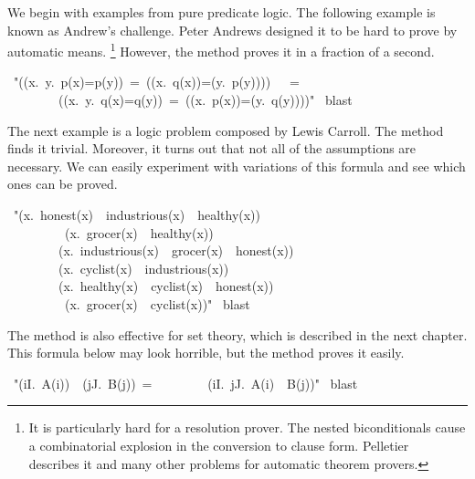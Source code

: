  We begin with examples from pure predicate logic. The following 
example is known as Andrew's challenge. Peter Andrews designed 
it to be hard to prove by automatic means.%
\footnote{It is particularly hard for a resolution prover.  The
nested biconditionals cause a combinatorial explosion in the conversion to
clause form.  Pelletier~\cite{pelletier86} describes it and many other
problems for automatic theorem provers.} 
However, the
 method proves it in a fraction  of a second. 
\begin{isabelle}
\
"(({\isasymexists}x.\
{\isasymforall}y.\
p(x){=}p(y))\
=\
(({\isasymexists}x.\
q(x))=({\isasymforall}y.\
p(y))))\
\ \ =\ \ \ \ \isanewline
\ \ \ \ \ \ \ \
(({\isasymexists}x.\
{\isasymforall}y.\
q(x){=}q(y))\ =\ (({\isasymexists}x.\ p(x))=({\isasymforall}y.\ q(y))))"\isanewline
\isacommand{by}\ blast
\end{isabelle}
The next example is a logic problem composed by Lewis Carroll. 
The \isa{blast} method finds it trivial. Moreover, it turns out 
that not all of the assumptions are necessary. We can easily 
experiment with variations of this formula and see which ones 
can be proved. 
\begin{isabelle}
\
"({\isasymforall}x.\
honest(x)\ \isasymand\
industrious(x)\ \isasymlongrightarrow\
healthy(x))\
\isasymand\ \ \isanewline
\ \ \ \ \ \ \ \ \isasymnot\ ({\isasymexists}x.\
grocer(x)\ \isasymand\
healthy(x))\
\isasymand\ \isanewline
\ \ \ \ \ \ \ \ ({\isasymforall}x.\
industrious(x)\ \isasymand\
grocer(x)\ \isasymlongrightarrow\
honest(x))\
\isasymand\ \isanewline
\ \ \ \ \ \ \ \ ({\isasymforall}x.\
cyclist(x)\ \isasymlongrightarrow\
industrious(x))\
\isasymand\ \isanewline
\ \ \ \ \ \ \ \ ({\isasymforall}x.\
{\isasymnot}healthy(x)\ \isasymand\
cyclist(x)\ \isasymlongrightarrow\
{\isasymnot}honest(x))\
\ \isanewline
\ \ \ \ \ \ \ \ \isasymlongrightarrow\
({\isasymforall}x.\
grocer(x)\ \isasymlongrightarrow\
{\isasymnot}cyclist(x))"\isanewline
\isacommand{by}\ blast
\end{isabelle}
The \isa{blast} method is also effective for set theory, which is
described in the next chapter.  This formula below may look horrible, but
the \isa{blast} method proves it easily. 
\begin{isabelle}
\isacommand{lemma}\ "({\isasymUnion}i{\isasymin}I.\ A(i))\ \isasyminter\ ({\isasymUnion}j{\isasymin}J.\ B(j))\ =\isanewline
\ \ \ \ \ \ \ \ ({\isasymUnion}i{\isasymin}I.\ {\isasymUnion}j{\isasymin}J.\ A(i)\ \isasyminter\ B(j))"\isanewline
\isacommand{by}\ blast
\end{isabelle}

